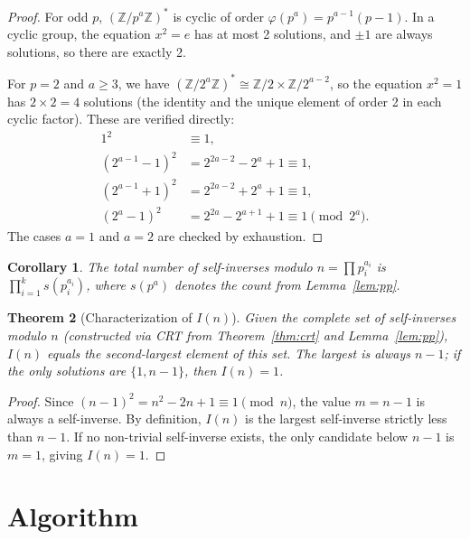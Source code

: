 \documentclass[12pt,a4paper]{article}
\newtheorem{theorem}{Theorem}
\newtheorem{corollary}[theorem]{Corollary}
\begin{document}
\begin{proof}
For odd $p$, $(\mathbb{Z}/p^a\mathbb{Z})^*$ is cyclic of order $\varphi(p^a) = p^{a-1}(p-1)$. In a cyclic group, the equation $x^2 = e$ has at most 2 solutions, and $\pm 1$ are always solutions, so there are exactly 2.

For $p = 2$ and $a \ge 3$, we have $(\mathbb{Z}/2^a\mathbb{Z})^* \cong \mathbb{Z}/2 \times \mathbb{Z}/2^{a-2}$, so the equation $x^2 = 1$ has $2 \times 2 = 4$ solutions (the identity and the unique element of order 2 in each cyclic factor). These are verified directly:
\begin{align*}
    1^2 &\equiv 1, \\
    (2^{a-1}-1)^2 &= 2^{2a-2} - 2^a + 1 \equiv 1, \\
    (2^{a-1}+1)^2 &= 2^{2a-2} + 2^a + 1 \equiv 1, \\
    (2^a - 1)^2 &= 2^{2a} - 2^{a+1} + 1 \equiv 1 \pmod{2^a}.
\end{align*}
The cases $a = 1$ and $a = 2$ are checked by exhaustion.
\end{proof}

\begin{corollary}
The total number of self-inverses modulo $n = \prod p_i^{a_i}$ is $\prod_{i=1}^{k} s(p_i^{a_i})$, where $s(p^a)$ denotes the count from Lemma~\ref{lem:pp}.
\end{corollary}

\begin{theorem}[Characterization of $I(n)$]\label{thm:In}
Given the complete set of self-inverses modulo $n$ (constructed via CRT from Theorem~\ref{thm:crt} and Lemma~\ref{lem:pp}), $I(n)$ equals the second-largest element of this set. The largest is always $n-1$; if the only solutions are $\{1, n-1\}$, then $I(n) = 1$.
\end{theorem}

\begin{proof}
Since $(n-1)^2 = n^2 - 2n + 1 \equiv 1 \pmod{n}$, the value $m = n-1$ is always a self-inverse. By definition, $I(n)$ is the largest self-inverse strictly less than $n-1$. If no non-trivial self-inverse exists, the only candidate below $n-1$ is $m = 1$, giving $I(n) = 1$.
\end{proof}

\section{Algorithm}
\end{document}
